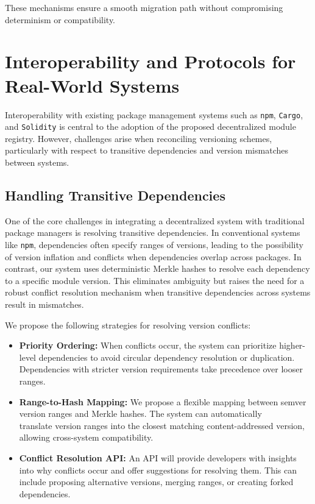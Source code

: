 \documentclass[sigplan,screen]{acmart}
\begin{document}
These mechanisms ensure a smooth migration path without compromising determinism or compatibility.

\section{Interoperability and Protocols for Real-World Systems}
\label{sec:interoperability-real-world}

Interoperability with existing package management systems such as \texttt{npm}, \texttt{Cargo}, and \texttt{Solidity} is central to the adoption of the proposed decentralized module registry. However, challenges arise when reconciling versioning schemes, particularly with respect to transitive dependencies and version mismatches between systems.

\subsection{Handling Transitive Dependencies}
One of the core challenges in integrating a decentralized system with traditional package managers is resolving transitive dependencies. In conventional systems like \texttt{npm}, dependencies often specify ranges of versions, leading to the possibility of version inflation and conflicts when dependencies overlap across packages. In contrast, our system uses deterministic Merkle hashes to resolve each dependency to a specific module version. This eliminates ambiguity but raises the need for a robust conflict resolution mechanism when transitive dependencies across systems result in mismatches.

We propose the following strategies for resolving version conflicts:

\begin{itemize}
    \item \textbf{Priority Ordering:} When conflicts occur, the system can prioritize higher-level dependencies to avoid circular dependency resolution or duplication. Dependencies with stricter version requirements take precedence over looser ranges.
    \item \textbf{Range-to-Hash Mapping:} We propose a flexible mapping between semver version ranges and Merkle hashes. The system can automatically \\translate version ranges into the closest matching content-addressed version, allowing cross-system compatibility.
    \item \textbf{Conflict Resolution API:} An API will provide developers with insights into why conflicts occur and offer suggestions for resolving them. This can include proposing alternative versions, merging ranges, or creating forked dependencies.
\end{itemize}
\end{document}

